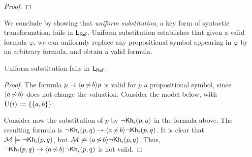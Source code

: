 \begin{textonuevo}
\begin{proof}
%
%
%
\end{proof}
\end{textonuevo}

We conclude by showing that \emph{uniform substitution}, a key form of syntactic transformation, fails in $\mathsf{L_{Ref}}$. Uniform substitution establishes that given a valid formula $\varphi$, we can uniformly replace any propositional symbol appearing in $\varphi$ by an arbitrary formula, and obtain a valid formula.

\medskip

\begin{proposition}\label{prop:substitution-ref}
    Uniform substitution fails in $\mathsf{L_{Ref}}$.
\end{proposition}

\begin{proof}
The formula $p\to\langle a{\,\not\sim\,}b \rangle p$ is valid for $p$ a propositional symbol, since $\langle a{\,\not\sim\,}b \rangle$ does not change the valuation. Consider the model below, with $\operatorname{U}(i):=\{ \{ a,b \} \}$:

\begin{center}
\end{center}

Consider now the substitution of $p$ by $\neg{\sf Kh}_i(p,q)$ in the formula above. The resulting formula is $\neg{\sf Kh}_i(p,q)\to\langle a{\,\not\sim\,}b \rangle\neg{\sf Kh}_i(p,q)$. It is clear that $\mathcal{M}\models\neg{\sf Kh}_i(p,q)$, but $\mathcal{M}\not\models\langle a{\,\not\sim\,}b \rangle\neg{\sf Kh}_i(p,q)$. Thus, $\neg{\sf Kh}_i(p,q)\to\langle a{\,\not\sim\,}b \rangle\neg{\sf Kh}_i(p,q)$ is not valid.
\end{proof}

